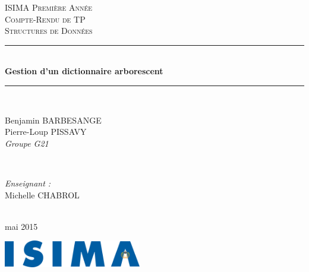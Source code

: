 \begin{titlepage}
  \newcommand{\HRule}{\rule{\linewidth}{0.5mm}}
  \center
  \null{}
  \vspace{3cm}

  \textsc{\LARGE ISIMA Première Année}\\[1.5cm]
  \textsc{\Large Compte-Rendu de TP}\\[0.5cm]
  \textsc{\LARGE Structures de Données}\\[1.5cm]
  \HRule \\[0.4cm]
  { \huge \bfseries Gestion d'un dictionnaire arborescent}\\
  \HRule \\[1.5cm]

  \begin{minipage}{0.4\textwidth}
    \begin{flushleft} \large
      Benjamin BARBESANGE\\
      Pierre-Loup PISSAVY\\
      {\normalsize\textit{Groupe G21}}
    \end{flushleft}
  \end{minipage}
  ~
  \begin{minipage}{0.4\textwidth}
    \begin{flushright} \large
      \emph{Enseignant :} \\
      Michelle CHABROL
    \end{flushright}
  \end{minipage}\\[4cm]

  {\large mai 2015}\\[3cm]

  \vfill

  \includegraphics[width=6cm]{settings/ISIMA_logo.pdf}\\[1cm]
\end{titlepage}
